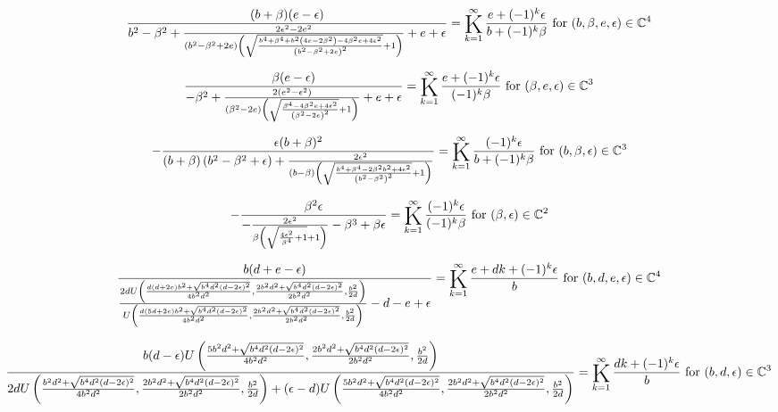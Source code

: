 \documentclass{article}
\newcommand{\bigK}{\mathop{\raisebox{-5pt}{\huge K}}}
\begin{document}
\[\frac{(b+\beta ) (e-\epsilon )}{b^2-\beta ^2+\frac{2 \epsilon ^2-2 e^2}{\left(b^2-\beta ^2+2 e\right) \left(\sqrt{\frac{b^4+\beta ^4+b^2 \left(4 e-2 \beta ^2\right)-4 \beta ^2 e+4 \epsilon ^2}{\left(b^2-\beta ^2+2 e\right)^2}}+1\right)}+e+\epsilon }=\bigK_{k=1}^{\infty}\frac{e+(-1)^k \epsilon }{b+(-1)^k \beta }\text{ for }(b,\beta ,e,\epsilon )\in \mathbb{C}^4\] 

\[\frac{\beta  (e-\epsilon )}{-\beta ^2+\frac{2 \left(e^2-\epsilon ^2\right)}{\left(\beta ^2-2 e\right) \left(\sqrt{\frac{\beta ^4-4 \beta ^2 e+4 \epsilon ^2}{\left(\beta ^2-2 e\right)^2}}+1\right)}+e+\epsilon }=\bigK_{k=1}^{\infty}\frac{e+(-1)^k \epsilon }{(-1)^k \beta }\text{ for }(\beta ,e,\epsilon )\in \mathbb{C}^3\] 

\[-\frac{\epsilon  (b+\beta )^2}{(b+\beta ) \left(b^2-\beta ^2+\epsilon \right)+\frac{2 \epsilon ^2}{(b-\beta ) \left(\sqrt{\frac{b^4+\beta ^4-2 \beta ^2 b^2+4 \epsilon ^2}{\left(b^2-\beta ^2\right)^2}}+1\right)}}=\bigK_{k=1}^{\infty}\frac{(-1)^k \epsilon }{b+(-1)^k \beta }\text{ for }(b,\beta ,\epsilon )\in \mathbb{C}^3\] 

\[-\frac{\beta ^2 \epsilon }{-\frac{2 \epsilon ^2}{\beta  \left(\sqrt{\frac{4 \epsilon ^2}{\beta ^4}+1}+1\right)}-\beta ^3+\beta  \epsilon }=\bigK_{k=1}^{\infty}\frac{(-1)^k \epsilon }{(-1)^k \beta }\text{ for }(\beta ,\epsilon )\in \mathbb{C}^2\] 

\[\frac{b (d+e-\epsilon )}{\frac{2 d U\left(\frac{d (d+2 e) b^2+\sqrt{b^4 d^2 (d-2 \epsilon )^2}}{4 b^2 d^2},\frac{2 b^2 d^2+\sqrt{b^4 d^2 (d-2 \epsilon )^2}}{2 b^2 d^2},\frac{b^2}{2 d}\right)}{U\left(\frac{d (5 d+2 e) b^2+\sqrt{b^4 d^2 (d-2 \epsilon )^2}}{4 b^2 d^2},\frac{2 b^2 d^2+\sqrt{b^4 d^2 (d-2 \epsilon )^2}}{2 b^2 d^2},\frac{b^2}{2 d}\right)}-d-e+\epsilon }=\bigK_{k=1}^{\infty}\frac{e+d k+(-1)^k \epsilon }{b}\text{ for }(b,d,e,\epsilon )\in \mathbb{C}^4\] 

\[\frac{b (d-\epsilon ) U\left(\frac{5 b^2 d^2+\sqrt{b^4 d^2 (d-2 \epsilon )^2}}{4 b^2 d^2},\frac{2 b^2 d^2+\sqrt{b^4 d^2 (d-2 \epsilon )^2}}{2 b^2 d^2},\frac{b^2}{2 d}\right)}{2 d U\left(\frac{b^2 d^2+\sqrt{b^4 d^2 (d-2 \epsilon )^2}}{4 b^2 d^2},\frac{2 b^2 d^2+\sqrt{b^4 d^2 (d-2 \epsilon )^2}}{2 b^2 d^2},\frac{b^2}{2 d}\right)+(\epsilon -d) U\left(\frac{5 b^2 d^2+\sqrt{b^4 d^2 (d-2 \epsilon )^2}}{4 b^2 d^2},\frac{2 b^2 d^2+\sqrt{b^4 d^2 (d-2 \epsilon )^2}}{2 b^2 d^2},\frac{b^2}{2 d}\right)}=\bigK_{k=1}^{\infty}\frac{d k+(-1)^k \epsilon }{b}\text{ for }(b,d,\epsilon )\in \mathbb{C}^3\] 
\end{document}
